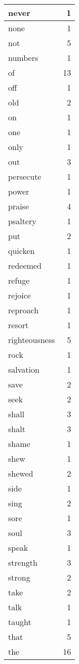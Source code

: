 \begin{center}
\begin{longtable}{l|r}
never & 1 \\ \hline
none & 1 \\ \hline
not & 5 \\ \hline
numbers & 1 \\ \hline
of & 13 \\ \hline
off & 1 \\ \hline
old & 2 \\ \hline
on & 1 \\ \hline
one & 1 \\ \hline
only & 1 \\ \hline
out & 3 \\ \hline
persecute & 1 \\ \hline
power & 1 \\ \hline
praise & 4 \\ \hline
psaltery & 1 \\ \hline
put & 2 \\ \hline
quicken & 1 \\ \hline
redeemed & 1 \\ \hline
refuge & 1 \\ \hline
rejoice & 1 \\ \hline
reproach & 1 \\ \hline
resort & 1 \\ \hline
righteousness & 5 \\ \hline
rock & 1 \\ \hline
salvation & 1 \\ \hline
save & 2 \\ \hline
seek & 2 \\ \hline
shall & 3 \\ \hline
shalt & 3 \\ \hline
shame & 1 \\ \hline
shew & 1 \\ \hline
shewed & 2 \\ \hline
side & 1 \\ \hline
sing & 2 \\ \hline
sore & 1 \\ \hline
soul & 3 \\ \hline
speak & 1 \\ \hline
strength & 3 \\ \hline
strong & 2 \\ \hline
take & 2 \\ \hline
talk & 1 \\ \hline
taught & 1 \\ \hline
that & 5 \\ \hline
the & 16 \\ \hline

\end{longtable}
\end{center}

